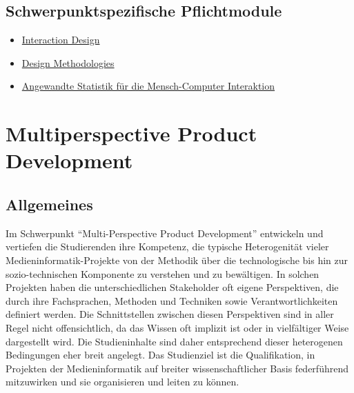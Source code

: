 \section*{Schwerpunktspezifische
Pflichtmodule\label{/mi-2017/modulbeschreibungen-master/schwerpunkt-human-computer-interaction}}\label{schwerpunktspezifische-pflichtmodulepathlabelmi-2017modulbeschreibungen-masterschwerpunkt-human-computer-interaction}

\begin{itemize}
\tightlist
\item
  \hyperref[/mi-2017/modulbeschreibungen-master/MA_HCI_InteractionDesign]{Interaction
  Design}
\item
  \hyperref[/mi-2017/modulbeschreibungen-master/MA_HCI_Design_Methodologies]{Design
  Methodologies}
\item
  \hyperref[/mi-2017/modulbeschreibungen-master/MA_HCI_Modul_Statistical_Methods_for_HCI]{Angewandte
  Statistik für die Mensch-Computer Interaktion}
\end{itemize}

\chapter{Multiperspective Product
Development\label{/mi-2017/modulbeschreibungen-master/schwerpunkt-multiperspective-product-development}}\label{multiperspective-product-developmentpathlabelmi-2017modulbeschreibungen-masterschwerpunkt-multiperspective-product-development}

\section*{Allgemeines\label{/mi-2017/modulbeschreibungen-master/schwerpunkt-multiperspective-product-development}}\label{allgemeinespathlabelmi-2017modulbeschreibungen-masterschwerpunkt-multiperspective-product-development}

Im Schwerpunkt ``Multi-Perspective Product Development'' entwickeln und
vertiefen die Studierenden ihre Kompetenz, die typische Heterogenität
vieler Medieninformatik-Projekte von der Methodik über die
technologische bis hin zur sozio-technischen Komponente zu verstehen und
zu bewältigen. In solchen Projekten haben die unterschiedlichen
Stakeholder oft eigene Perspektiven, die durch ihre Fachsprachen,
Methoden und Techniken sowie Verantwortlichkeiten definiert werden. Die
Schnittstellen zwischen diesen Perspektiven sind in aller Regel nicht
offensichtlich, da das Wissen oft implizit ist oder in vielfältiger
Weise dargestellt wird. Die Studieninhalte sind daher entsprechend
dieser heterogenen Bedingungen eher breit angelegt. Das Studienziel ist
die Qualifikation, in Projekten der Medieninformatik auf breiter
wissenschaftlicher Basis federführend mitzuwirken und sie organisieren
und leiten zu können.

